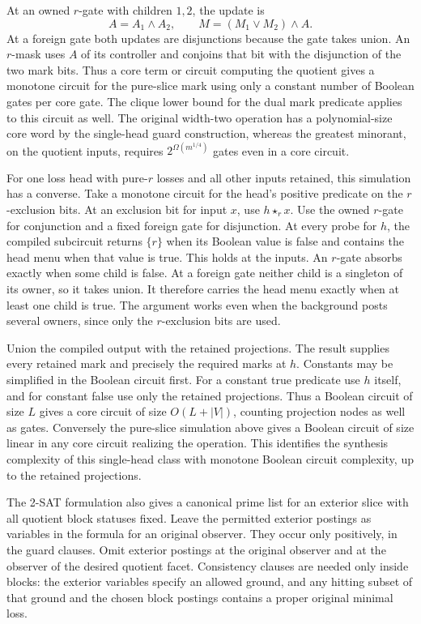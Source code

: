 At an owned $r$-gate with children $1,2$, the
update is
\[
 A=A_1\wedge A_2,\qquad
 M=(M_1\vee M_2)\wedge A.
\]
At a foreign gate both updates are disjunctions
because the gate takes union. An $r$-mask uses
$A$ of its controller and conjoins that bit with
the disjunction of the two mark bits. Thus a core
term or circuit computing the quotient gives a
monotone circuit for the pure-slice mark using
only a constant number of Boolean gates per
core gate. The clique lower bound for the dual
mark predicate applies to this circuit as well.
The original width-two operation has a
polynomial-size core word by the single-head
guard construction, whereas the greatest
minorant, on the quotient inputs, requires
$2^{\Omega(m^{1/4})}$ gates even in a core
circuit.

For one loss head with pure-$r$ losses and all
other inputs retained, this simulation has a
converse. Take a monotone circuit for the head's
positive predicate on the $r$-exclusion bits.
At an exclusion bit for input $x$, use
$h\star_r x$. Use the owned $r$-gate for
conjunction and a fixed foreign gate for
disjunction. At every probe for $h$, the compiled
subcircuit returns $\{r\}$ when its Boolean value
is false and contains the head menu when that
value is true. This holds at the inputs. An
$r$-gate absorbs exactly when some child is
false. At a foreign gate neither child is a
singleton of its owner, so it takes union.
It therefore carries the head menu exactly when
at least one child is true. The argument works
even when the background posts several owners,
since only the $r$-exclusion bits are used.

Union the compiled output with the retained
projections. The result supplies every retained
mark and precisely the required marks at $h$.
Constants may be simplified in the Boolean
circuit first. For a constant true predicate use
$h$ itself, and for constant false use only the
retained projections. Thus a Boolean circuit of
size $L$ gives a core circuit of size $O(L+|V|)$,
counting projection nodes as well as gates.
Conversely the pure-slice simulation above gives
a Boolean circuit of size linear in any core
circuit realizing the operation. This identifies
the synthesis complexity of this single-head
class with monotone Boolean circuit complexity,
up to the retained projections.

The 2-SAT formulation also gives a canonical prime
list for an exterior slice with all quotient block
statuses fixed. Leave the permitted exterior
postings as variables in the formula for an
original observer. They occur only positively, in
the guard clauses. Omit exterior postings at the
original observer and at the observer of the
desired quotient facet. Consistency clauses are
needed only inside blocks: the exterior variables
specify an allowed ground, and any hitting subset
of that ground and the chosen block postings
contains a proper original minimal loss.

